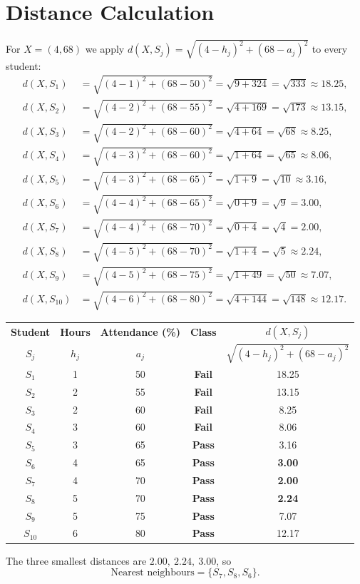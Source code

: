 \documentclass[11pt,a4paper]{report}
\newcommand{\classpass}{\textbf{\textcolor{cteal}{Pass}}}
\newcommand{\classfail}{\textbf{\textcolor{ccoral}{Fail}}}
\theoremstyle{definition}
\theoremstyle{remark}
\begin{document}
	\section{Distance Calculation}
	For $X=(4,68)$ we apply $d(X,S_j)=\sqrt{(4-h_j)^2+(68-a_j)^2}$ to every student:
	\begin{align*}
		d(X,S_1)   &=\sqrt{(4-1)^2+(68-50)^2}=\sqrt{9+324}=\sqrt{333}\approx18.25,\\
		d(X,S_2)   &=\sqrt{(4-2)^2+(68-55)^2}=\sqrt{4+169}=\sqrt{173}\approx13.15,\\
		d(X,S_3)   &=\sqrt{(4-2)^2+(68-60)^2}=\sqrt{4+64}=\sqrt{68}\approx8.25,\\
		d(X,S_4)   &=\sqrt{(4-3)^2+(68-60)^2}=\sqrt{1+64}=\sqrt{65}\approx8.06,\\
		d(X,S_5)   &=\sqrt{(4-3)^2+(68-65)^2}=\sqrt{1+9}=\sqrt{10}\approx3.16,\\
		d(X,S_6)   &=\sqrt{(4-4)^2+(68-65)^2}=\sqrt{0+9}=\sqrt{9}=3.00,\\
		d(X,S_7)   &=\sqrt{(4-4)^2+(68-70)^2}=\sqrt{0+4}=\sqrt{4}=2.00,\\
		d(X,S_8)   &=\sqrt{(4-5)^2+(68-70)^2}=\sqrt{1+4}=\sqrt{5}\approx2.24,\\
		d(X,S_9)   &=\sqrt{(4-5)^2+(68-75)^2}=\sqrt{1+49}=\sqrt{50}\approx7.07,\\
		d(X,S_{10})&=\sqrt{(4-6)^2+(68-80)^2}=\sqrt{4+144}=\sqrt{148}\approx12.17.
	\end{align*}
	
	\begin{center}
		\renewcommand{\arraystretch}{1.2}
		\begin{tabular}{c c c c c}
			\toprule
			\textbf{Student} & \textbf{Hours} & \textbf{Attendance (\%)} & \textbf{Class} & $d(X,S_{j})$ \\
			$S_{j}$ & $h_{j}$ & $a_{j}$ & & $\sqrt{(4-h_j)^2+(68-a_j)^2}$ \\
			\midrule
			$S_{1}$  & 1 & 50 & \classfail & 18.25\\
			$S_{2}$  & 2 & 55 & \classfail & 13.15\\
			$S_{3}$  & 2 & 60 & \classfail & 8.25\\
			$S_{4}$  & 3 & 60 & \classfail & 8.06\\
			$S_{5}$  & 3 & 65 & \classpass & 3.16\\
			$S_{6}$  & 4 & 65 & \classpass & \textbf{3.00}\\
			$S_{7}$  & 4 & 70 & \classpass & \textbf{2.00}\\
			$S_{8}$  & 5 & 70 & \classpass & \textbf{2.24}\\
			$S_{9}$  & 5 & 75 & \classpass & 7.07\\
			$S_{10}$ & 6 & 80 & \classpass & 12.17\\
			\bottomrule
		\end{tabular}
	\end{center}
	The three smallest distances are $2.00,\ 2.24,\ 3.00$, so
	\[
	\boxed{\text{Nearest neighbours}=\{S_7,S_8,S_6\}.}
	\]
	
\end{document}
